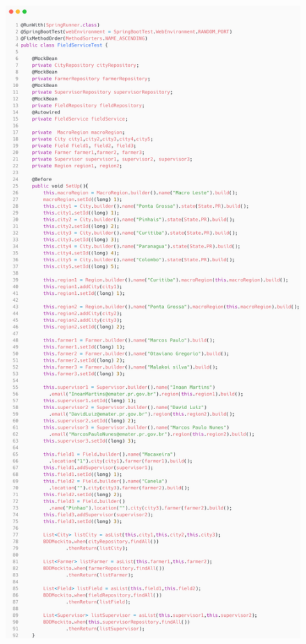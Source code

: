 \begin{figure}[H]
	\centering
	\includegraphics[scale=0.13]{dados/figuras/carbonFieldServicebuild.png}
\end{figure}

